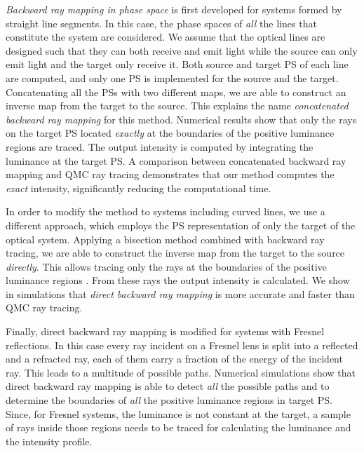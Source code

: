 \textit{Backward ray mapping in phase space} is first developed for systems formed by straight line segments. In this case, the phase spaces of \textit{all} the lines that constitute the system are considered. We assume that the optical lines are designed such that they can both receive and emit light while the source can only emit light and the target only receive it. Both source and target PS of each line are computed, and only one PS is implemented for the source and the target. Concatenating all the PSs with two different maps, we are able to construct an inverse map from the target to the source. This explains the name \textit{concatenated backward ray mapping} for this method. Numerical results show that only the rays on the target PS located \textit{exactly} at the boundaries of the positive luminance regions are traced. The output intensity is computed by integrating the luminance at the target PS. A comparison between concatenated backward ray mapping and QMC ray tracing demonstrates that our method computes the \textit{exact} intensity, significantly reducing the computational time. 

In order to modify the method to systems including curved lines, we use a different approach, which employs the PS representation of only the target of the optical system. Applying a bisection method combined with backward ray tracing, we are able to construct the inverse map from the target to the source \textit{directly}. This allows tracing only the rays at the boundaries of the positive luminance regions \cite{filosa2017inverse}. From these rays the output intensity is calculated. We show in simulations that \textit{direct backward ray mapping} is more accurate and faster than QMC ray tracing.

Finally, direct backward ray mapping is modified for systems with Fresnel reflections. In this case every ray incident on a Fresnel lens is split into a reflected and a refracted ray, each of them carry a fraction of the energy of the incident ray. This leads to a multitude of possible paths. 
Numerical simulations show that direct backward ray mapping is able to detect \textit{all} the possible paths and to determine the boundaries of \textit{all} the positive luminance regions in target PS. Since, for Fresnel systems, the luminance is not constant at the target, a sample of rays inside those regions needs to be traced for calculating the luminance and the intensity profile.
